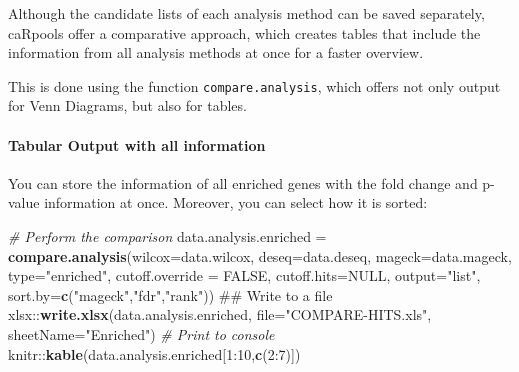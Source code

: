 \documentclass[]{article}
\newenvironment{Shaded}{\begin{snugshade}}{\end{snugshade}}
\newcommand{\KeywordTok}[1]{\textcolor[rgb]{0.13,0.29,0.53}{\textbf{{#1}}}}
\newcommand{\DataTypeTok}[1]{\textcolor[rgb]{0.13,0.29,0.53}{{#1}}}
\newcommand{\DecValTok}[1]{\textcolor[rgb]{0.00,0.00,0.81}{{#1}}}
\newcommand{\StringTok}[1]{\textcolor[rgb]{0.31,0.60,0.02}{{#1}}}
\newcommand{\CommentTok}[1]{\textcolor[rgb]{0.56,0.35,0.01}{\textit{{#1}}}}
\newcommand{\OtherTok}[1]{\textcolor[rgb]{0.56,0.35,0.01}{{#1}}}
\newcommand{\NormalTok}[1]{{#1}}
\let\oldparagraph\paragraph
\renewcommand{\paragraph}[1]{\oldparagraph{#1}\mbox{}}
\begin{document}
Although the candidate lists of each analysis method can be saved
separately, caRpools offer a comparative approach, which creates tables
that include the information from all analysis methods at once for a
faster overview.

This is done using the function \texttt{compare.analysis}, which offers
not only output for Venn Diagrams, but also for tables.

\paragraph{Tabular Output with all
information}\label{tabular-output-with-all-information}

You can store the information of all enriched genes with the fold change
and p-value information at once. Moreover, you can select how it is
sorted:

\begin{Shaded}
\begin{Highlighting}[]
\CommentTok{# Perform the comparison}
\NormalTok{data.analysis.enriched =}\StringTok{ }\KeywordTok{compare.analysis}\NormalTok{(}\DataTypeTok{wilcox=}\NormalTok{data.wilcox,}
    \DataTypeTok{deseq=}\NormalTok{data.deseq, }\DataTypeTok{mageck=}\NormalTok{data.mageck, }\DataTypeTok{type=}\StringTok{"enriched"}\NormalTok{,}
    \DataTypeTok{cutoff.override =} \OtherTok{FALSE}\NormalTok{, }\DataTypeTok{cutoff.hits=}\OtherTok{NULL}\NormalTok{, }\DataTypeTok{output=}\StringTok{"list"}\NormalTok{,}
    \DataTypeTok{sort.by=}\KeywordTok{c}\NormalTok{(}\StringTok{"mageck"}\NormalTok{,}\StringTok{"fdr"}\NormalTok{,}\StringTok{"rank"}\NormalTok{))}
\NormalTok{## Write to a file}
\NormalTok{xlsx::}\KeywordTok{write.xlsx}\NormalTok{(data.analysis.enriched,}
    \DataTypeTok{file=}\StringTok{"COMPARE-HITS.xls"}\NormalTok{,}
    \DataTypeTok{sheetName=}\StringTok{"Enriched"}\NormalTok{)}
\CommentTok{# Print to console}
\NormalTok{knitr::}\KeywordTok{kable}\NormalTok{(data.analysis.enriched[}\DecValTok{1}\NormalTok{:}\DecValTok{10}\NormalTok{,}\KeywordTok{c}\NormalTok{(}\DecValTok{2}\NormalTok{:}\DecValTok{7}\NormalTok{)])}
\end{Highlighting}
\end{Shaded}
\end{document}
